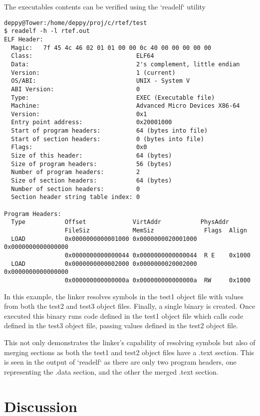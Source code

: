 \documentclass{article}
\begin{document}
The executables contents can be verified using the `readelf` utility

\begin{verbatim}
deppy@Tower:/home/deppy/proj/c/rtef/test
$ readelf -h -l rtef.out
ELF Header:
  Magic:   7f 45 4c 46 02 01 01 00 00 0c 40 00 00 00 00 00
  Class:                             ELF64
  Data:                              2's complement, little endian
  Version:                           1 (current)
  OS/ABI:                            UNIX - System V
  ABI Version:                       0
  Type:                              EXEC (Executable file)
  Machine:                           Advanced Micro Devices X86-64
  Version:                           0x1
  Entry point address:               0x20001000
  Start of program headers:          64 (bytes into file)
  Start of section headers:          0 (bytes into file)
  Flags:                             0x0
  Size of this header:               64 (bytes)
  Size of program headers:           56 (bytes)
  Number of program headers:         2
  Size of section headers:           64 (bytes)
  Number of section headers:         0
  Section header string table index: 0

Program Headers:
  Type           Offset             VirtAddr           PhysAddr
                 FileSiz            MemSiz              Flags  Align
  LOAD           0x0000000000001000 0x0000000020001000 0x0000000000000000
                 0x0000000000000044 0x0000000000000044  R E    0x1000
  LOAD           0x0000000000002000 0x0000000020002000 0x0000000000000000
                 0x000000000000000a 0x000000000000000a  RW     0x1000
\end{verbatim}

In this example, the linker resolves symbols in the test1 object file with values from both the test2 and test3 object files. Finally, a single binary is created. Once executed this binary runs code defined in the test1 object file which calls code defined in the test3 object file, passing values defined in the test2 object file.

This not only demonstrates the linker's capability of resolving symbols but also of merging sections as both the test1 and test2 object files have a .text section. This is seen in the output of `readelf` as there are only two program headers, one representing the .data section, and the other the merged .text section.

\section{Discussion}
\end{document}
